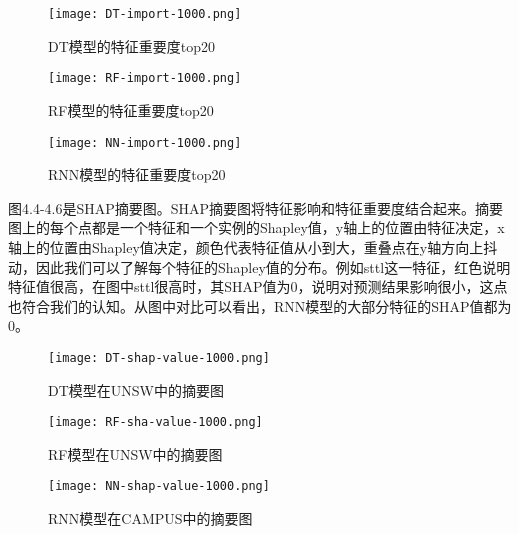 \begin{figure}[htbp]
  \centering
  \begin{minipage}[t]{0.48\textwidth}
  \centering
  \texttt{[image: DT-import-1000.png]}
  \caption{DT模型的特征重要度top20}
  
  \end{minipage}
  \begin{minipage}[t]{0.48\textwidth}
  \centering
  \texttt{[image: RF-import-1000.png]}
  \caption{RF模型的特征重要度top20}
 
  \end{minipage}

  \begin{minipage}[t]{0.48\textwidth}
    \centering
    \texttt{[image: NN-import-1000.png]}
    \caption{RNN模型的特征重要度top20}
    
    \end{minipage}
  \end{figure}



图4.4-4.6是SHAP摘要图。SHAP摘要图将特征影响和特征重要度结合起来。摘要图上的每个点都是一个特征和一个实例的Shapley值，y轴上的位置由特征决定，x轴上的位置由Shapley值决定，颜色代表特征值从小到大，重叠点在y轴方向上抖动，因此我们可以了解每个特征的Shapley值的分布。例如sttl这一特征，红色说明特征值很高，在图中sttl很高时，其SHAP值为0，说明对预测结果影响很小，这点也符合我们的认知。从图中对比可以看出，RNN模型的大部分特征的SHAP值都为0。


\begin{figure}[htbp]
  \centering
  \begin{minipage}[t]{0.48\textwidth}
  \centering
  \texttt{[image: DT-shap-value-1000.png]}
  \caption{DT模型在UNSW中的摘要图}
  \end{minipage}
  \begin{minipage}[t]{0.48\textwidth}
  \centering
  \texttt{[image: RF-sha-value-1000.png]}
  \caption{RF模型在UNSW中的摘要图}
  \end{minipage}

  \begin{minipage}[t]{0.48\textwidth}
    \centering
    \texttt{[image: NN-shap-value-1000.png]}
    \caption{RNN模型在CAMPUS中的摘要图}
    \end{minipage}
  \end{figure}

